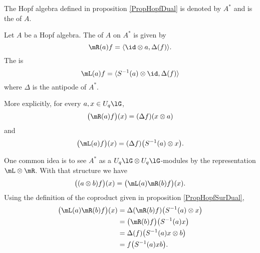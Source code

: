 The Hopf algebra defined in proposition \ref{PropHopfDual} is denoted by \( A^*\) and is the  of \( A\).

\begin{definition}  \label{DefUMXgVdT}
    Let \( A\) be a Hopf algebra. The  of \( A\) on \( A^*\) is given by
    \begin{equation}        
        \mR(a)f=\langle \id\otimes a, \Delta(f)\rangle .
    \end{equation}
    The  is 
    \begin{equation}
        \mL(a)f=\langle S^{-1}(a)\otimes \id, \Delta(f)\rangle 
    \end{equation}
    where \( \Delta\) is the antipode of \( A^*\).
\end{definition}
More explicitly, for every \( a,x\in U_q\lG\),
\begin{equation}
    \big( \mR(a)f \big)(x)=(\Delta f)(x\otimes a)
\end{equation}
and
\begin{equation}
    \big( \mL(a)f \big)(x)=(\Delta f)\big( S^{-1}(a)\otimes x \big).
\end{equation}

One common idea is to see \( A^*\) as a \( U_q\lG\otimes U_q\lG\)-modules by the representation \( \mL\otimes\mR\). With that structure we have
\begin{equation}        \label{EqmRmLAAsurAstar}
    \big( (a\otimes b)f \big)(x)=\big( \mL(a)\mR(b)f \big)(x).
\end{equation}
Using the definition of the coproduct given in proposition \ref{PropHopfSurDual},
\begin{equation}        \label{EqmRmLabf}
    \begin{aligned}[]
        \big( \mL(a)\mR(b)f \big)(x)&=\Delta(\mR(b)f)\big( S^{-1}(a)\otimes x \big)\\
        &=\big( \mR(b)f \big)\big( S^{-1}(a)x \big)\\
        &=\Delta(f)\big( S^{-1}(a)x\otimes b \big)\\
        &=f\big( S^{-1}(a)xb \big).
    \end{aligned}
\end{equation}

